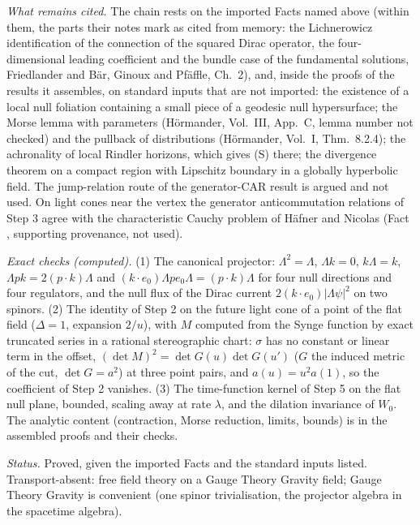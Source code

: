 \emph{What remains cited.} The chain rests on the imported Facts named above (within them, the parts their notes mark as cited from memory: the Lichnerowicz identification of the connection of the squared Dirac operator, the four-dimensional leading coefficient and the bundle case of the fundamental solutions, Friedlander and B\"ar, Ginoux and Pf\"affle, Ch.~2), and, inside the proofs of the results it assembles, on standard inputs that are not imported: the existence of a local null foliation containing a small piece of a geodesic null hypersurface; the Morse lemma with parameters (H\"ormander, Vol.~III, App.~C, lemma number not checked) and the pullback of distributions (H\"ormander, Vol.~I, Thm.~8.2.4); the achronality of local Rindler horizons, which gives (S) there; the divergence theorem on a compact region with Lipschitz boundary in a globally hyperbolic field. The jump-relation route of the generator-CAR result is argued and not used. On light cones near the vertex the generator anticommutation relations of Step 3 agree with the characteristic Cauchy problem of Häfner and Nicolas (Fact , supporting provenance, not used).

\emph{Exact checks (computed).} (1) The canonical projector: $\Lambda^{2} = \Lambda$, $\Lambda k = 0$, $k\Lambda = k$, $\Lambda pk = 2(p\cdot k)\Lambda$ and $(k\cdot e_{0})\Lambda pe_{0}\Lambda = (p\cdot k)\Lambda$ for four null directions and four regulators, and the null flux of the Dirac current $2(k\cdot e_{0})|\Lambda\psi|^{2}$ on two spinors. (2) The identity of Step 2 on the future light cone of a point of the flat field ($\Delta = 1$, expansion $2/u$), with $M$ computed from the Synge function by exact truncated series in a rational stereographic chart: $\sigma$ has no constant or linear term in the offset, $(\det M)^{2} = \det G(u)\det G(u')$ ($G$ the induced metric of the cut, $\det G = a^{2}$) at three point pairs, and $a(u) = u^{2}a(1)$, so the coefficient of Step 2 vanishes. (3) The time-function kernel of Step 5 on the flat null plane, bounded, scaling away at rate $\lambda$, and the dilation invariance of $W_{0}$. The analytic content (contraction, Morse reduction, limits, bounds) is in the assembled proofs and their checks.

\emph{Status.} Proved, given the imported Facts and the standard inputs listed. Transport-absent: free field theory on a Gauge Theory Gravity field; Gauge Theory Gravity is convenient (one spinor trivialisation, the projector algebra in the spacetime algebra).
